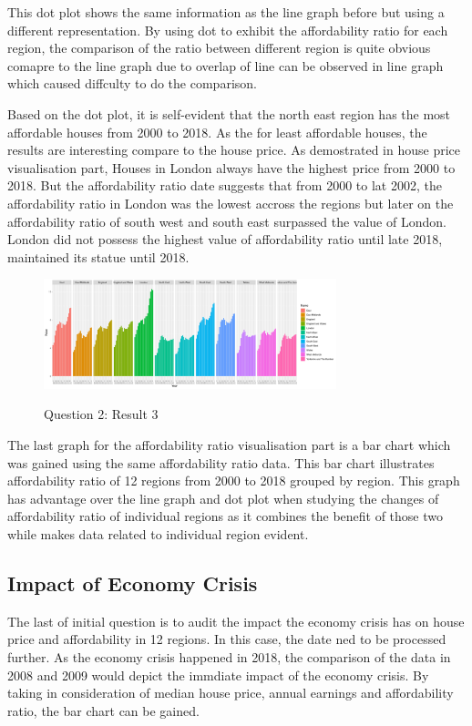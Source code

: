 \documentclass{article}
\begin{document}
This dot plot shows the same information as the line graph before but using a different representation. 
By using dot to exhibit the affordability ratio for each region, the comparison of the ratio between different 
region is quite obvious comapre to the line graph due to overlap of line can be observed in line graph 
which caused diffculty to do the comparison.

Based on the dot plot, it is self-evident that the north east region has the most affordable houses from 2000 
to 2018. As the for least affordable houses, the results are interesting compare to the house price. 
As demostrated in house price visualisation part, Houses in London always have the highest price from 2000 to 2018.
But the affordability ratio date suggests that from 2000 to lat 2002, the affordability ratio in London was the lowest 
accross the regions but later on the affordability ratio of south west and south east surpassed the value of London. 
London did not possess the highest value of affordability ratio until late 2018, maintained its statue until 2018.


\begin{figure}[htb]
  \begin{minipage}[b]{1.0\linewidth}
    \centering
    \centerline{\includegraphics[width=8.5cm]{Q2Geom_gridbar}}
    \centerline{Question 2: Result 3}\medskip
  \end{minipage}
\end{figure}

The last graph for the affordability ratio visualisation part is a bar chart which was gained using the same 
affordability ratio data. This bar chart illustrates affordability ratio of 12 regions from 2000 to 2018 
grouped by region. This graph has advantage over the line graph and dot plot when studying the changes of affordability ratio of individual 
regions as it combines the benefit of those two while makes data related to individual region evident.



\subsection{Impact of Economy Crisis}
The last of initial question is to audit the impact the economy crisis has on house price and affordability
in 12 regions. In this case, the date ned to be processed further. As the economy crisis happened in 2018, 
the comparison of the data in 2008 and 2009 would depict the immdiate impact of the economy crisis. By taking 
in consideration of median house price, annual earnings and affordability ratio, the bar chart can be gained.
\end{document}
